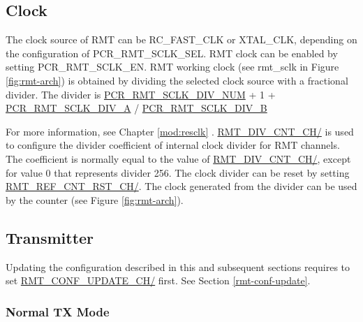 \documentclass[main\_\_EN.tex]{subfiles}
\begin{document}
\subsection{Clock}\label{rmt-clock}

The clock source of RMT can be RC\_FAST\_CLK or XTAL\_CLK, depending on the configuration of PCR\_RMT\_SCLK\_SEL. RMT clock can be enabled by setting PCR\_RMT\_SCLK\_EN. RMT working clock (see rmt\_sclk in Figure \ref{fig:rmt-arch}) is obtained by dividing the selected clock source with a fractional divider. The divider is \hyperref[fielddesc:PCRRMTSCLKDIVNUM]{PCR\_RMT\_SCLK\_DIV\_NUM} + 1 + \hyperref[fielddesc:PCRRMTSCLKDIVA]{PCR\_RMT\_SCLK\_DIV\_A} / \hyperref[fielddesc:PCRRMTSCLKDIVB]{PCR\_RMT\_SCLK\_DIV\_B}

For more information, see Chapter \ref{mod:resclk} \textit{}. \hyperref[fielddesc:RMTDIVCNTCHN]{RMT\_DIV\_CNT\_CH/} is used to configure the divider coefficient of internal clock divider for RMT channels. The coefficient is normally equal to the value of \hyperref[fielddesc:RMTDIVCNTCHN]{RMT\_DIV\_CNT\_CH/}, except for value 0 that represents divider 256. The clock divider can be reset by setting \hyperref[fielddesc:RMTREFCNTRSTCHN]{RMT\_REF\_CNT\_RST\_CH/}. The clock generated from the divider can be used by the counter (see Figure \ref{fig:rmt-arch}).

\subsection{Transmitter}
\vspace{0.4cm}

\begin{tiplisting}
Updating the configuration described in this and subsequent sections requires to set \hyperref[fielddesc:RMTCONFUPDATECHN]{RMT\_CONF\_UPDATE\_CH/} first. See Section \ref{rmt-conf-update}.
\end{tiplisting}
\vspace{1em}

\subsubsection{Normal TX Mode}\label{sec:normal-tx-mode}
\end{document}
